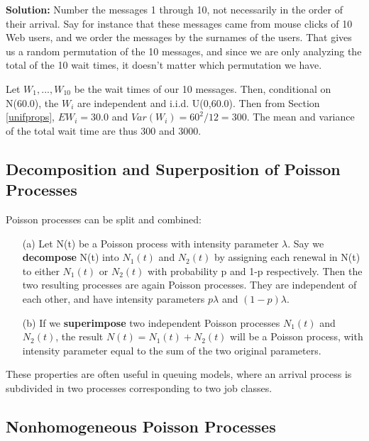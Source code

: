 {\bf Solution:}  Number the messages 1 through 10, not necessarily in
the order of their arrival.  Say for instance that these messages came
from mouse clicks of 10 Web users, and we order the messages by the
surnames of the users.  That gives us a random permutation of the 10
messages, and since we are only analyzing the total of the 10 wait
times, it doesn't matter which permutation we have.
 
Let $W_1,...,W_{10}$ be the wait times of our 10 messages.  Then,
conditional on N(60.0), the $W_i$ are independent and i.i.d. U(0,60.0).
Then from Section \ref{unifprops}, $EW_i = 30.0$ and $Var(W_i) = 60^2/12
= 300$.  The mean and variance of the total wait time are thus
300 and 3000.

\subsection{Decomposition and Superposition of Poisson Processes}

\begin{theorem}

Poisson processes can be split and combined:

\begin{itemize}

\item [(a)] Let N(t) be a Poisson process with intensity parameter
$\lambda$.  Say we \textbf{decompose} N(t) into $N_{1}(t)$ and
$N_{2}(t)$ by assigning each renewal in N(t) to either $N_{1}(t)$ or
$N_{2}(t)$ with probability p and 1-p respectively.  Then the two
resulting processes are again Poisson processes.  They are independent
of each other, and have intensity parameters $p\lambda $ and
$(1-p)\lambda $. 

\item [(b)] If we \textbf{superimpose} two independent Poisson processes
$N_{1}(t)$ and $N_{2}(t)$, the result $N(t) = N_{1}(t) + N_{2}(t)$
will be a Poisson process, with intensity parameter equal to the sum of
the two original parameters.

\end{itemize}

\end{theorem}

These properties are often useful in queuing models, where an arrival
process is subdivided in two processes corresponding to two job classes.

\subsection{Nonhomogeneous Poisson Processes}


